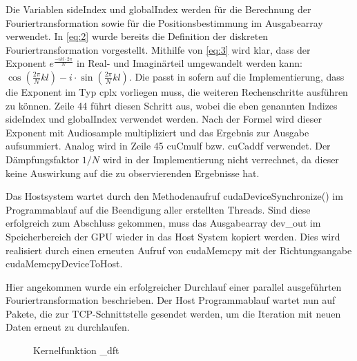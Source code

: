 Die Variablen sideIndex und globalIndex werden für die Berechnung der Fouriertransformation sowie für die Positionsbestimmung im Ausgabearray verwendet.
In \eqref{eq:2} wurde bereits die Definition der diskreten Fouriertransformation vorgestellt. Mithilfe von \eqref{eq:3} wird klar, dass der Exponent $e^{\frac{-ikl\cdot 2\pi}{N}}$ in Real- und Imaginärteil umgewandelt werden kann: $\cos(\frac{2\pi}{N}kl) - i \cdot \sin(\frac{2\pi}{N}kl)$. Die passt in sofern auf die Implementierung, dass die Exponent im Typ cplx vorliegen muss, die weiteren Rechenschritte ausführen zu können. Zeile 44 führt diesen Schritt aus, wobei die eben genannten Indizes sideIndex und globalIndex verwendet werden. Nach der Formel wird dieser Exponent mit Audiosample multipliziert und das Ergebnis zur Ausgabe aufsummiert. Analog wird in Zeile 45 cuCmulf bzw. cuCaddf verwendet. Der Dämpfungsfaktor $1/N$ wird in der Implementierung nicht verrechnet, da dieser keine Auswirkung auf die zu observierenden Ergebnisse hat.

Das Hostsystem wartet durch den Methodenaufruf cudaDeviceSynchronize() im Programmablauf auf die Beendigung aller erstellten Threads. Sind diese erfolgreich zum Abschluss gekommen, muss das Ausgabearray dev\_out im Speicherbereich der GPU wieder in das Host System kopiert werden. Dies wird realisiert durch einen erneuten Aufruf von cudaMemcpy mit der Richtungsangabe cudaMemcpyDeviceToHost.

Hier angekommen wurde ein erfolgreicher Durchlauf einer parallel ausgeführten Fouriertransformation beschrieben. Der Host Programmablauf wartet nun auf Pakete, die zur TCP-Schnittstelle gesendet werden, um die Iteration mit neuen Daten erneut zu durchlaufen.

\begin{figure}[t!]
	
	\caption{Kernelfunktion \_dft}
	\label{fig:devicedft}
\end{figure}

